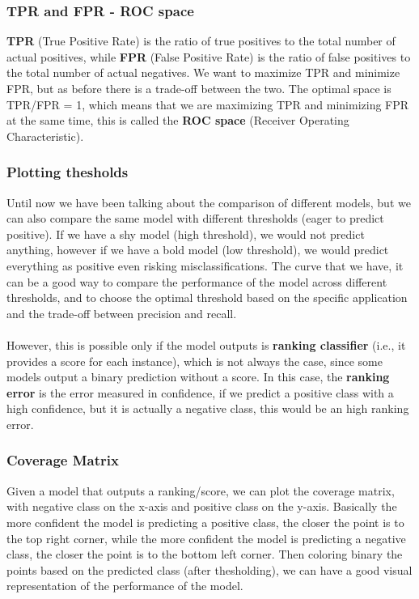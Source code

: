 \subsubsection{TPR and FPR - ROC space}
\textbf{TPR} (True Positive Rate) is the ratio of true positives to the total number of actual positives, while \textbf{FPR} (False Positive Rate) is the ratio of false positives to the total number of actual negatives.
We want to maximize TPR and minimize FPR, but as before there is a trade-off between the two.
The optimal space is TPR/FPR = 1, which means that we are maximizing TPR and minimizing FPR at the same time, this is called the \textbf{ROC space} (Receiver Operating Characteristic).

\subsubsection{Plotting thesholds}
Until now we have been talking about the comparison of different models, but we can also compare the same model with different thresholds (eager to predict positive).
If we have a shy model (high threshold), we would not predict anything, however if we have a bold model (low threshold), we would predict everything as positive even risking misclassifications.
The curve that we have, it can be a good way to compare the performance of the model across different thresholds, and to choose the optimal threshold based on the specific application and the trade-off between precision and recall.
\\\\
However, this is possible only if the model outputs is \textbf{ranking classifier} (i.e., it provides a score for each instance), which is not always the case, since some models output a binary prediction without a score.
In this case, the \textbf{ranking error} is the error measured in confidence, if we predict a positive class with a high confidence, but it is actually a negative class, this would be an high ranking error.

\subsubsection{Coverage Matrix}
Given a model that outputs a ranking/score, we can plot the coverage matrix, with negative class on the x-axis and positive class on the y-axis.
Basically the more confident the model is predicting a positive class, the closer the point is to the top right corner, while the more confident the model is predicting a negative class, the closer the point is to the bottom left corner.
Then coloring binary the points based on the predicted class (after thesholding), we can have a good visual representation of the performance of the model.

